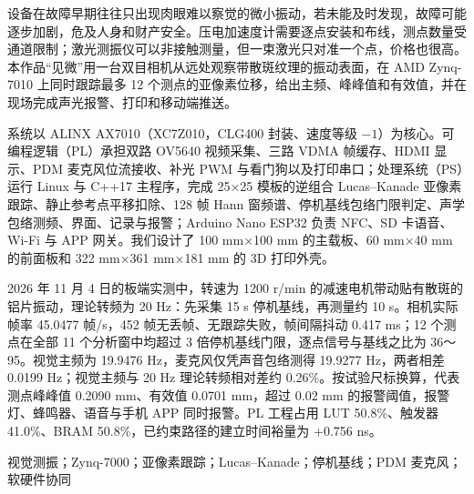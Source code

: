 设备在故障早期往往只出现肉眼难以察觉的微小振动，若未能及时发现，故障可能逐步加剧，危及人身和财产安全。压电加速度计需要逐点安装和布线，测点数量受通道限制；激光测振仪可以非接触测量，但一束激光只对准一个点，价格也很高。本作品“见微”用一台双目相机从远处观察带散斑纹理的振动表面，在 AMD Zynq-7010 上同时跟踪最多 12 个测点的亚像素位移，给出主频、峰峰值和有效值，并在现场完成声光报警、打印和移动端推送。

系统以 ALINX AX7010（XC7Z010，CLG400 封装、速度等级 $-1$）为核心。可编程逻辑（PL）承担双路 OV5640 视频采集、三路 VDMA 帧缓存、HDMI 显示、PDM 麦克风位流接收、补光 PWM 与看门狗以及打印串口；处理系统（PS）运行 Linux 与 C++17 主程序，完成 25×25 模板的逆组合 Lucas–Kanade 亚像素跟踪、静止参考点平移扣除、128 帧 Hann 窗频谱、停机基线包络门限判定、声学包络测频、界面、记录与报警；Arduino Nano ESP32 负责 NFC、SD 卡语音、Wi-Fi 与 APP 网关。我们设计了 100 mm×100 mm 的主载板、60 mm×40 mm 的前面板和 322 mm×361 mm×181 mm 的 3D 打印外壳。

2026 年 11 月 4 日的板端实测中，转速为 1200 r/min 的减速电机带动贴有散斑的铝片振动，理论转频为 20 Hz：先采集 15 s 停机基线，再测量约 10 s。相机实际帧率 45.0477 帧/s，452 帧无丢帧、无跟踪失败，帧间隔抖动 0.417 ms；12 个测点在全部 11 个分析窗中均超过 3 倍停机基线门限，逐点信号与基线之比为 36～95。视觉主频为 19.9476 Hz，麦克风仅凭声音包络测得 19.9277 Hz，两者相差 0.0199 Hz；视觉主频与 20 Hz 理论转频相对差约 0.26\%。按试验尺标换算，代表测点峰峰值 0.2090 mm、有效值 0.0701 mm，超过 0.02 mm 的报警阈值，报警灯、蜂鸣器、语音与手机 APP 同时报警。PL 工程占用 LUT 50.8\%、触发器 41.0\%、BRAM 50.8\%，已约束路径的建立时间裕量为 +0.756 ns。

\vspace{4mm}
视觉测振；Zynq-7000；亚像素跟踪；Lucas–Kanade；停机基线；PDM 麦克风；软硬件协同
